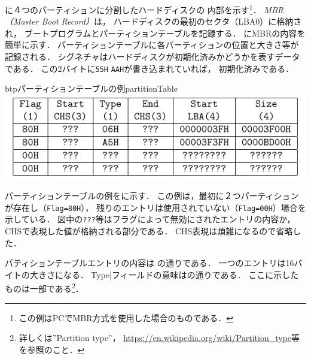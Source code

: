 \begin{enumerate}
  に４つのパーティションに分割したハードディスクの
  内部を示す\footnote{この例はPCでMBR方式を使用した場合のものである．}．
  \emph{MBR（Master Boot Record）}は，
  ハードディスクの最初のセクタ（LBA0）に格納され，
  ブートプログラムとパーティションテーブルを記録する．
  にMBRの内容を簡単に示す．
  パーティションテーブルに各パーティションの位置と大きさ等が記録される．
  シグネチャはハードディスクが初期化済みかどうかを表すデータである．
  この2バイトに\texttt{55H} \texttt{AAH}が書き込まれていれば，
  初期化済みである．
  
  \begin{myfig}{btp}{パーティションテーブルの例}{partitionTable}
    \includegraphics[scale=1.0]{Fig/partitionTable.pdf}
  \end{myfig}

  パーティションテーブルの例をに示す．
  この例は，最初に２つパーティションが存在し（\texttt{Flag=80H}），
  残りのエントリは使用されていない（\texttt{Flag=00H}）場合を示している．
  図中の\texttt{???}等はフラグによって無効にされたエントリの内容か，
  CHSで表現した値が格納される部分である．
  CHS表現は煩雑になるので省略した．

  パティションテーブルエントリの内容は
  の通りである．
  一つのエントリは16バイトの大きさになる．
  \|Type|フィールドの意味はの通りである．
  ここに示したものは一部である\footnote{
    詳しくは''Partition type''，
    \url{https://en.wikipedia.org/wiki/Partition_type}等を参照のこと．}．


\end{enumerate}
